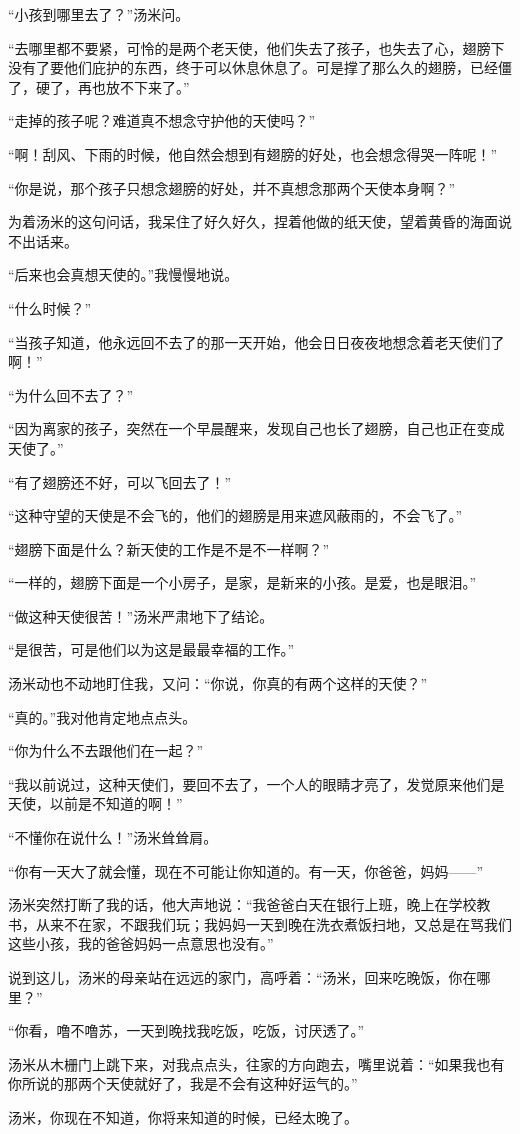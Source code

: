 \par “小孩到哪里去了？”汤米问。
\par “去哪里都不要紧，可怜的是两个老天使，他们失去了孩子，也失去了心，翅膀下没有了要他们庇护的东西，终于可以休息休息了。可是撑了那么久的翅膀，已经僵了，硬了，再也放不下来了。”
\par “走掉的孩子呢？难道真不想念守护他的天使吗？”
\par “啊！刮风、下雨的时候，他自然会想到有翅膀的好处，也会想念得哭一阵呢！”
\par “你是说，那个孩子只想念翅膀的好处，并不真想念那两个天使本身啊？”
\par 为着汤米的这句问话，我呆住了好久好久，捏着他做的纸天使，望着黄昏的海面说不出话来。
\par “后来也会真想天使的。”我慢慢地说。
\par “什么时候？”
\par “当孩子知道，他永远回不去了的那一天开始，他会日日夜夜地想念着老天使们了啊！”
\par “为什么回不去了？”
\par “因为离家的孩子，突然在一个早晨醒来，发现自己也长了翅膀，自己也正在变成天使了。”
\par “有了翅膀还不好，可以飞回去了！”
\par “这种守望的天使是不会飞的，他们的翅膀是用来遮风蔽雨的，不会飞了。”
\par “翅膀下面是什么？新天使的工作是不是不一样啊？”
\par “一样的，翅膀下面是一个小房子，是家，是新来的小孩。是爱，也是眼泪。”
\par “做这种天使很苦！”汤米严肃地下了结论。
\par “是很苦，可是他们以为这是最最幸福的工作。”
\par 汤米动也不动地盯住我，又问：“你说，你真的有两个这样的天使？”
\par “真的。”我对他肯定地点点头。
\par “你为什么不去跟他们在一起？”
\par “我以前说过，这种天使们，要回不去了，一个人的眼睛才亮了，发觉原来他们是天使，以前是不知道的啊！”
\par “不懂你在说什么！”汤米耸耸肩。
\par “你有一天大了就会懂，现在不可能让你知道的。有一天，你爸爸，妈妈——”
\par 汤米突然打断了我的话，他大声地说：“我爸爸白天在银行上班，晚上在学校教书，从来不在家，不跟我们玩；我妈妈一天到晚在洗衣煮饭扫地，又总是在骂我们这些小孩，我的爸爸妈妈一点意思也没有。”
\par 说到这儿，汤米的母亲站在远远的家门，高呼着：“汤米，回来吃晚饭，你在哪里？”
\par “你看，噜不噜苏，一天到晚找我吃饭，吃饭，讨厌透了。”
\par 汤米从木栅门上跳下来，对我点点头，往家的方向跑去，嘴里说着：“如果我也有你所说的那两个天使就好了，我是不会有这种好运气的。”
\par 汤米，你现在不知道，你将来知道的时候，已经太晚了。


